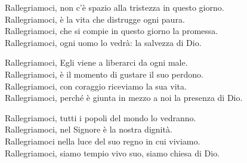 
\strofa Rallegriamoci, non c'è spazio alla tristezza in questo giorno.\\
Rallegriamoci, è la vita che distrugge ogni paura.\\
Rallegriamoci, che si compie in questo giorno la promessa.\\
Rallegriamoci, ogni uomo lo vedrà: la salvezza di Dio.

\spazio

 

\spazio

\strofa Rallegriamoci, Egli viene a liberarci da ogni male.\\
Rallegriamoci, è il momento di gustare il suo perdono.\\
Rallegriamoci, con coraggio riceviamo la sua vita.\\
Rallegriamoci, perché è giunta in mezzo a noi la presenza di Dio.

\spazio


\spazio

\strofa Rallegriamoci, tutti i popoli del mondo lo vedranno.\\
Rallegriamoci, nel Signore è la nostra dignità.\\
Rallegriamoci nella luce del suo regno in cui viviamo.\\
Rallegriamoci, siamo tempio vivo suo, siamo chiesa di Dio.

\spazio

